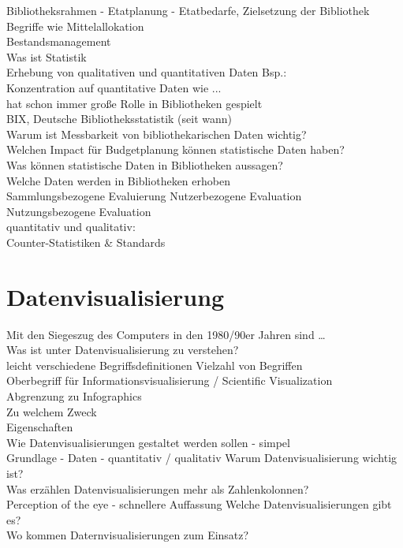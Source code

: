 \clearpage
Bibliotheksrahmen - Etatplanung - Etatbedarfe, Zielsetzung der Bibliothek\\
Begriffe wie Mittelallokation\\
Bestandsmanagement\\
Was ist Statistik\\
Erhebung von qualitativen und quantitativen Daten Bsp.:\\
Konzentration auf quantitative Daten wie ...\\
hat schon immer große Rolle in Bibliotheken gespielt\\
BIX, Deutsche Bibliotheksstatistik (seit wann)\\
Warum ist Messbarkeit von bibliothekarischen Daten wichtig?\\
Welchen Impact für Budgetplanung können statistische Daten haben?\\
Was können statistische Daten in Bibliotheken aussagen?\\
Welche Daten werden in Bibliotheken erhoben\\
Sammlungsbezogene Evaluierung
Nutzerbezogene Evaluation\\
Nutzungsbezogene Evaluation\\
quantitativ und qualitativ:\\
Counter-Statistiken \& Standards\\

\clearpage

\section{Datenvisualisierung}
Mit den Siegeszug des Computers in den 1980/90er Jahren sind \dots\\
Was ist unter Datenvisualisierung zu verstehen?\\
leicht verschiedene Begriffsdefinitionen
Vielzahl von Begriffen\\ 
Oberbegriff für Informationsvisualisierung / Scientific Visualization\\
Abgrenzung zu Infographics\\
Zu welchem Zweck\\
Eigenschaften\\
Wie Datenvisualisierungen gestaltet werden sollen - simpel\\
Grundlage - Daten - quantitativ / qualitativ
Warum Datenvisualisierung wichtig ist?\\
Was erzählen Datenvisualisierungen mehr als Zahlenkolonnen?\\
Perception of the eye - schnellere Auffassung
Welche Datenvisualisierungen gibt es?\\
Wo kommen Daternvisualisierungen zum Einsatz?\\



